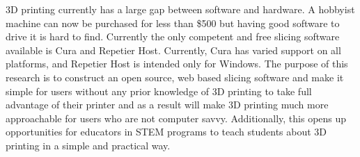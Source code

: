 % 
% 
%

3D printing currently has a large gap between software and hardware. 
A hobbyist machine can now be purchased for less than \$500 but having good software to drive it is hard to find. 
Currently the only competent and free slicing software available is Cura and Repetier Host. 
Currently, Cura has varied support on all platforms, and Repetier Host is intended only for Windows. 
The purpose of this research is to construct an open source, web based slicing software and make it simple for users without any prior knowledge of 3D printing to take full advantage of their printer and as a result will make 3D printing much more approachable for users who are not computer savvy. 
Additionally, this opens up opportunities for educators in STEM programs to teach students about 3D printing in a simple and practical way.
